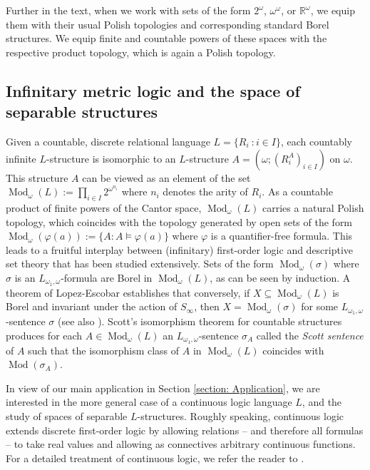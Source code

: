 \documentclass[12pt]{amsart}
\DeclareMathOperator{\Mod}{Mod}
\begin{document}
Further in the text, when we work with sets of the form $2^\omega$, $\omega^\omega$, or $\mathbb{R}^{\omega}$, we equip them with their usual Polish topologies and corresponding standard Borel structures. We equip finite and countable powers of these spaces with the respective product topology, which is again a Polish topology.

\subsection{Infinitary metric logic and the space of separable structures}\label{sec: infinitary metric logic}

Given a countable, discrete relational language $L=\{R_i ~\colon i\in I\}$, each countably infinite $L$-structure is isomorphic to an $L$-structure $A=(\omega;(R_i^A)_{i\in I})$ on $\omega$. This structure $A$ can be viewed as an element of the set $\Mod_\omega(L):=\prod_{i\in I}2^{\omega^{n_i}}$ where $n_i$ denotes the arity of $R_i$. As a countable product of finite powers of the Cantor space, $\Mod_\omega(L)$ carries a natural Polish topology, which coincides with the topology generated by open sets of the form $\Mod_\omega(\varphi(a)):=\{A \colon A\models \varphi(a)\}$ where $\varphi$ is a quantifier-free formula. This leads to a fruitful interplay between (infinitary) first-order logic and descriptive set theory that has been studied extensively.  
Sets of the form $\Mod_\omega(\sigma)$ where $\sigma$ is an $L_{\omega_1, \omega}$-formula are Borel in $\Mod_\omega(L)$, as can be seen by induction. A theorem of Lopez-Escobar \cite{Lopez1965} establishes that conversely, if $X\subseteq \Mod_\omega(L)$ is Borel and invariant under the action of $S_\infty$, then $X=\Mod_{\omega}(\sigma)$ for some $L_{\omega_1, \omega}$-sentence $\sigma$ (see also \cite[Chapter II.16]{MR1321597}). Scott's isomorphism theorem for countable structures produces for each $A\in\Mod_\omega(L)$ an $L_{\omega_1, \omega}$-sentence $\sigma_A$ called the \textit{Scott sentence} of $A$ such that the isomorphism class of $A$ in $\Mod_\omega(L)$ coincides with $\Mod(\sigma_A)$.


In view of our main application in Section \ref{section: Application}, we are interested in the more general case of a continuous logic language $L$, and the study of spaces of separable $L$-structures. Roughly speaking, continuous logic extends discrete first-order logic by allowing relations -- and therefore all formulas -- to take real values and allowing as connectives arbitrary continuous functions. For a detailed treatment of continuous logic, we refer the reader to \cite{MR2436146, MR4654490}.
\end{document}
